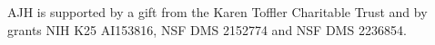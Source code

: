 \documentclass[12pt]{article} %
\begin{document}
AJH is supported by a gift from the Karen Toffler Charitable Trust and by grants NIH K25 AI153816, NSF DMS 2152774 and NSF DMS 2236854.

%
%
\end{document}

